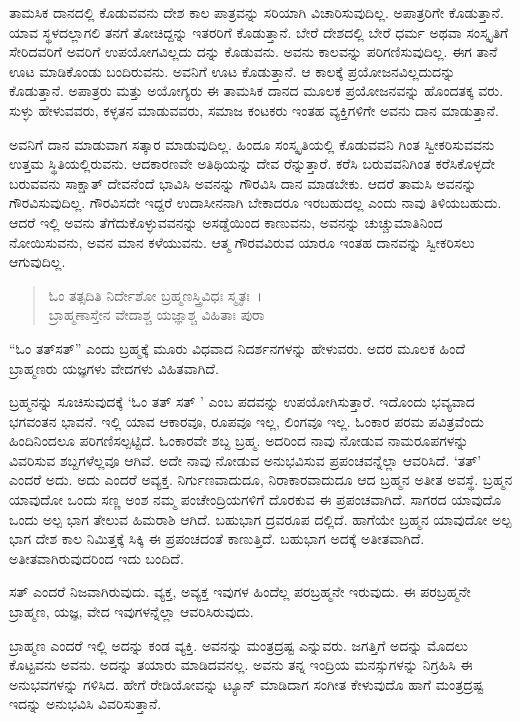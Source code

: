 ತಾಮಸಿಕ ದಾನದಲ್ಲಿ ಕೊಡುವವನು ದೇಶ ಕಾಲ ಪಾತ್ರವನ್ನು ಸರಿಯಾಗಿ ವಿಚಾರಿಸುವುದಿಲ್ಲ. ಅಪಾತ್ರರಿಗೇ ಕೊಡುತ್ತಾನೆ. ಯಾವ ಸ್ಥಳದಲ್ಲಾಗಲಿ ತನಗೆ ತೋಚಿದ್ದನ್ನು ಇತರರಿಗೆ ಕೊಡುತ್ತಾನೆ. ಬೇರೆ ದೇಶದಲ್ಲಿ ಬೇರೆ ಧರ್ಮ ಅಥವಾ ಸಂಸ್ಕೃತಿಗೆ ಸೇರಿದವರಿಗೆ ಅವರಿಗೆ ಉಪಯೋಗವಿಲ್ಲದು ದನ್ನು ಕೊಡುವನು. ಅವನು ಕಾಲವನ್ನು ಪರಿಗಣಿಸುವುದಿಲ್ಲ. ಈಗ ತಾನೆ ಊಟ ಮಾಡಿಕೊಂಡು ಬಂದಿರುವನು. ಅವನಿಗೆ ಊಟ ಕೊಡುತ್ತಾನೆ. ಆ ಕಾಲಕ್ಕೆ ಪ್ರಯೋಜನವಿಲ್ಲದುದನ್ನು ಕೊಡುತ್ತಾನೆ. ಅಪಾತ್ರರು ಮತ್ತು ಅಯೋಗ್ಯರು ಈ ತಾಮಸಿಕ ದಾನದ ಮೂಲಕ ಪ್ರಯೋಜನವನ್ನು ಹೊಂದತಕ್ಕ ವರು. ಸುಳ್ಳು ಹೇಳುವವರು, ಕಳ್ಳತನ ಮಾಡುವವರು, ಸಮಾಜ ಕಂಟಕರು ಇಂತಹ ವ್ಯಕ್ತಿಗಳಿಗೇ ಅವನು ದಾನ ಮಾಡುತ್ತಾನೆ.

ಅವನಿಗೆ ದಾನ ಮಾಡುವಾಗ ಸತ್ಕಾರ ಮಾಡುವುದಿಲ್ಲ. ಹಿಂದೂ ಸಂಸ್ಕೃತಿಯಲ್ಲಿ ಕೊಡುವವನಿ ಗಿಂತ ಸ್ವೀಕರಿಸುವವನು ಉತ್ತಮ ಸ್ಥಿತಿಯಲ್ಲಿರುವನು. ಆದಕಾರಣವೇ ಅತಿಥಿಯನ್ನು ದೇವ ರೆನ್ನುತ್ತಾರೆ. ಕರೆಸಿ ಬರುವವನಿಗಿಂತ ಕರೆಸಿಕೊಳ್ಳದೇ ಬರುವವನು ಸಾಕ್ಷಾತ್ ದೇವನೆಂದೆ ಭಾವಿಸಿ ಅವನನ್ನು ಗೌರವಿಸಿ ದಾನ ಮಾಡಬೇಕು. ಆದರೆ ತಾಮಸಿ ಅವನನ್ನು ಗೌರವಿಸುವುದಿಲ್ಲ. ಗೌರವಿಸದೇ ಇದ್ದರೆ ಉದಾಸೀನನಾಗಿ ಬೇಕಾದರೂ ಇರಬಹುದಲ್ಲ ಎಂದು ನಾವು ತಿಳಿಯಬಹುದು. ಆದರೆ ಇಲ್ಲಿ ಅವನು ತೆಗೆದುಕೊಳ್ಳುವವನನ್ನು ಅಸಡ್ಡೆಯಿಂದ ಕಾಣುವನು, ಅವನನ್ನು ಚುಚ್ಚುಮಾತಿನಿಂದ ನೋಯಿಸುವನು, ಅವನ ಮಾನ ಕಳೆಯುವನು. ಆತ್ಮ ಗೌರವವಿರುವ ಯಾರೂ ಇಂತಹ ದಾನವನ್ನು ಸ್ವೀಕರಿಸಲು ಆಗುವುದಿಲ್ಲ.

\begin{verse}
ಓಂ ತತ್ಸದಿತಿ ನಿರ್ದೇಶೋ ಬ್ರಹ್ಮಣಸ್ತ್ರಿವಿಧಃ ಸ್ಮೃತಃ~।\\ಬ್ರಾಹ್ಮಣಾಸ್ತೇನ ವೇದಾಶ್ಚ ಯಜ್ಞಾಶ್ಚ ವಿಹಿತಾಃ ಪುರಾ 
\end{verse}

{\small “ಓಂ ತತ್​ಸತ್​” ಎಂದು ಬ್ರಹ್ಮಕ್ಕೆ ಮೂರು ವಿಧವಾದ ನಿದರ್ಶನಗಳನ್ನು ಹೇಳುವರು. ಅದರ ಮೂಲಕ ಹಿಂದೆ ಬ್ರಾಹ್ಮಣರು ಯಜ್ಞಗಳು ವೇದಗಳು ವಿಹಿತವಾಗಿದೆ.}

ಬ್ರಹ್ಮನನ್ನು ಸೂಚಿಸುವುದಕ್ಕೆ ‘ಓಂ ತತ್ ಸತ್ ’ ಎಂಬ ಪದವನ್ನು ಉಪಯೋಗಿಸುತ್ತಾರೆ. ಇದೊಂದು ಭವ್ಯವಾದ ಭಗವಂತನ ಭಾವನೆ. ಇಲ್ಲಿ ಯಾವ ಆಕಾರವೂ, ರೂಪವೂ ಇಲ್ಲ, ಲಿಂಗವೂ ಇಲ್ಲ. ಓಂಕಾರ ಪರಮ ಪವಿತ್ರವೆಂದು ಹಿಂದಿನಿಂದಲೂ ಪರಿಗಣಿಸಲ್ಪಟ್ಟಿದೆ. ಓಂಕಾರವೇ ಶಬ್ದ ಬ್ರಹ್ಮ. ಅದರಿಂದ ನಾವು ನೋಡುವ ನಾಮರೂಪಗಳನ್ನು ವಿವರಿಸುವ ಶಬ್ದಗಳೆಲ್ಲವೂ ಆಗಿವೆ. ಅದೇ ನಾವು ನೋಡುವ ಅನುಭವಿಸುವ ಪ್ರಪಂಚವನ್ನೆಲ್ಲಾ ಆವರಿಸಿದೆ. ‘ತತ್​’ ಎಂದರೆ ಅದು. ಅದು ಎಂದರೆ ಅವ್ಯಕ್ತ. ನಿರ್ಗುಣವಾದುದೂ, ನಿರಾಕಾರವಾದುದೂ ಆದ ಬ್ರಹ್ಮನ ಅತೀತ ಅವಸ್ಥೆ. ಬ್ರಹ್ಮನ ಯಾವುದೋ ಒಂದು ಸಣ್ಣ ಅಂಶ ನಮ್ಮ ಪಂಚೇಂದ್ರಿಯಗಳಿಗೆ ದೊರಕುವ ಈ ಪ್ರಪಂಚವಾಗಿದೆ. ಸಾಗರದ ಯಾವುದೊ ಒಂದು ಅಲ್ಪ ಭಾಗ ತೇಲುವ ಹಿಮರಾಶಿ ಆಗಿದೆ. ಬಹುಭಾಗ ದ್ರವರೂಪ ದಲ್ಲಿದೆ. ಹಾಗೆಯೇ ಬ್ರಹ್ಮನ ಯಾವುದೋ ಅಲ್ಪ ಭಾಗ ದೇಶ ಕಾಲ ನಿಮಿತ್ತಕ್ಕೆ ಸಿಕ್ಕಿ ಈ ಪ್ರಪಂಚದಂತೆ ಕಾಣುತ್ತಿದೆ. ಬಹುಭಾಗ ಅದಕ್ಕೆ ಅತೀತವಾಗಿದೆ. ಅತೀತವಾಗಿರುವುದರಿಂದ ಇದು ಬಂದಿದೆ.

ಸತ್ ಎಂದರೆ ನಿಜವಾಗಿರುವುದು. ವ್ಯಕ್ತ, ಅವ್ಯಕ್ತ ಇವುಗಳ ಹಿಂದೆಲ್ಲ ಪರಬ್ರಹ್ಮನೇ ಇರುವುದು. ಈ ಪರಬ್ರಹ್ಮನೇ ಬ್ರಾಹ್ಮಣ, ಯಜ್ಞ, ವೇದ ಇವುಗಳನ್ನೆಲ್ಲಾ ಆವರಿಸಿರುವುದು.

ಬ್ರಾಹ್ಮಣ ಎಂದರೆ ಇಲ್ಲಿ ಅದನ್ನು ಕಂಡ ವ್ಯಕ್ತಿ. ಅವನನ್ನು ಮಂತ್ರದ್ರಷ್ಟ ಎನ್ನುವರು. ಜಗತ್ತಿಗೆ ಅದನ್ನು ಮೊದಲು ಕೊಟ್ಟವನು ಅವನು. ಅದನ್ನು ತಯಾರು ಮಾಡಿದವನಲ್ಲ. ಅವನು ತನ್ನ ಇಂದ್ರಿಯ ಮನಸ್ಸುಗಳನ್ನು ನಿಗ್ರಹಿಸಿ ಈ ಅನುಭವಗಳನ್ನು ಗಳಿಸಿದ. ಹೇಗೆ ರೇಡಿಯೋವನ್ನು ಟ್ಯೂನ್ ಮಾಡಿದಾಗ ಸಂಗೀತ ಕೇಳುವುದೊ ಹಾಗೆ ಮಂತ್ರದ್ರಷ್ಟ ಇದನ್ನು ಅನುಭವಿಸಿ ವಿವರಿಸುತ್ತಾನೆ.

